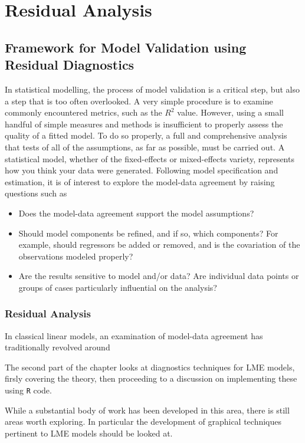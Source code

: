 \documentclass[Main.tex]{subfiles}
\begin{document}
\chapter{Residual Analysis}
\section{Framework for Model Validation using Residual Diagnostics}
In statistical modelling, the process of model validation is a critical step, but also a step that is too often overlooked. A very simple procedure is to examine commonly encountered
metrics, such as the $R^2$ value. However, using a small handful of simple measures and methods is insufficient to properly assess the quality of a fitted model. To do so properly, a full and comprehensive
analysis that tests of all of the assumptions, as far as possible, must be carried out. A statistical model, whether of the fixed-effects or mixed-effects variety, represents how you think your data
were generated. Following model specification and estimation, it is of interest to explore the model-data
agreement by raising questions such as
\begin{itemize}
	\item Does the model-data agreement support the model assumptions?
	\item Should model components be refined, and if so, which components? For example, should regressors
	be added or removed, and is the covariation of the observations modeled properly?
	\item Are the results sensitive to model and/or data? Are individual data points or groups of cases particularly
	influential on the analysis?
\end{itemize}


\subsection{Residual Analysis}

In classical linear models, an examination of model-data agreement has traditionally revolved around

The second part of the chapter looks at diagnostics techniques for LME models, firsly covering the theory, then proceeding to a discussion on 
implementing these using \texttt{R} code.

While a substantial body of work has been developed in this area, there is still areas worth exploring. 
In particular the development of graphical techniques pertinent to LME models should be looked at.
\end{document}
